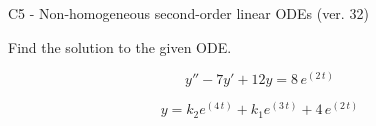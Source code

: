 \begin{exercise}
  \begin{exerciseTitle}C5 - Non-homogeneous second-order linear ODEs (ver. 32)\end{exerciseTitle}
  \begin{exerciseStatement}
    
Find the solution to the given ODE.

    
\[y''-7y'+12y = 8 \, e^{\left(2 \, t\right)}\]

  \end{exerciseStatement}
  \begin{exerciseAnswer}
    
\[y= k_{2} e^{\left(4 \, t\right)} + k_{1} e^{\left(3 \, t\right)} + 4 \, e^{\left(2 \, t\right)}\]

  \end{exerciseAnswer}
\end{exercise}